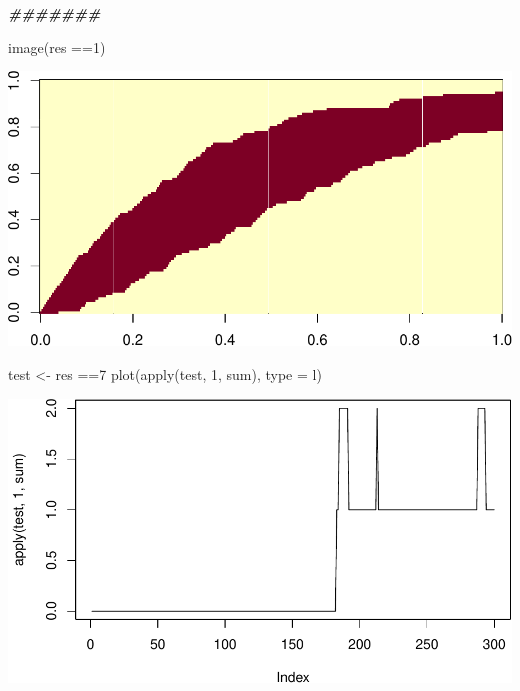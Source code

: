 \documentclass[
]{article}
\newenvironment{Shaded}{\begin{snugshade}}{\end{snugshade}}
\newcommand{\AttributeTok}[1]{\textcolor[rgb]{0.77,0.63,0.00}{#1}}
\newcommand{\DecValTok}[1]{\textcolor[rgb]{0.00,0.00,0.81}{#1}}
\newcommand{\DocumentationTok}[1]{\textcolor[rgb]{0.56,0.35,0.01}{\textbf{\textit{#1}}}}
\newcommand{\FunctionTok}[1]{\textcolor[rgb]{0.00,0.00,0.00}{#1}}
\newcommand{\NormalTok}[1]{#1}
\newcommand{\OtherTok}[1]{\textcolor[rgb]{0.56,0.35,0.01}{#1}}
\newcommand{\SpecialCharTok}[1]{\textcolor[rgb]{0.00,0.00,0.00}{#1}}
\newcommand{\StringTok}[1]{\textcolor[rgb]{0.31,0.60,0.02}{#1}}
\begin{document}
\begin{Shaded}
\begin{Highlighting}[]
\DocumentationTok{\#\#\#\#\#\#\#}



\FunctionTok{image}\NormalTok{(res }\SpecialCharTok{==}\DecValTok{1}\NormalTok{)}
\end{Highlighting}
\end{Shaded}

\includegraphics{examples_files/figure-latex/unnamed-chunk-2-3.pdf}

\begin{Shaded}
\begin{Highlighting}[]
\NormalTok{test }\OtherTok{\textless{}{-}}\NormalTok{ res }\SpecialCharTok{==}\DecValTok{7}
\FunctionTok{plot}\NormalTok{(}\FunctionTok{apply}\NormalTok{(test, }\DecValTok{1}\NormalTok{, sum), }\AttributeTok{type =} \StringTok{\textquotesingle{}l\textquotesingle{}}\NormalTok{)}
\end{Highlighting}
\end{Shaded}

\includegraphics{examples_files/figure-latex/unnamed-chunk-2-4.pdf}
\end{document}
